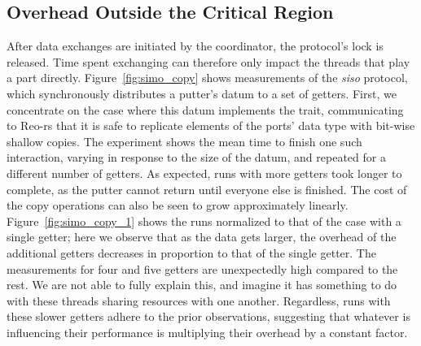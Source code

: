 \subsection{Overhead Outside the Critical Region}
After data exchanges are initiated by the coordinator, the protocol's lock is released. Time spent exchanging can therefore only impact the threads that play a part directly. Figure~\ref{fig:simo_copy} shows measurements of the \textit{siso} protocol, which synchronously distributes a putter's datum to a set of getters. First, we concentrate on the case where this datum implements the  trait, communicating to Reo-rs that it is safe to replicate elements of the ports' data type with bit-wise shallow copies. The experiment shows the mean time to finish one such interaction, varying in response to the size of the datum, and repeated for a different number of getters. As expected, runs with more getters took longer to complete, as the putter cannot return until everyone else is finished. The cost of the copy operations can also be seen to grow approximately linearly. Figure~\ref{fig:simo_copy_1} shows the runs normalized to that of the case with a single getter; here we observe that as the data gets larger, the overhead of the additional getters decreases in proportion to that of the single getter. The measurements for four and five getters are unexpectedly high compared to the rest. We are not able to fully explain this, and imagine it has something to do with these threads sharing resources with one another. Regardless, runs with these slower getters adhere to the prior observations, suggesting that whatever is influencing their performance is multiplying their overhead by a constant factor.
